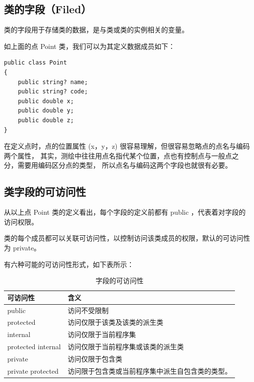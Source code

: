 \subsection{类的字段（Filed）}
类的字段用于存储类的数据，是与类或类的实例相关的变量。

如上面的点 Point 类，我们可以为其定义数据成员如下：

\begin{lstlisting}
public class Point
{
    public string? name;
    public string? code;
    public double x;
    public double y;
    public double z;
}
\end{lstlisting}

在定义点时，点的位置属性 (x，y，z) 很容易理解，但很容易忽略点的点名与编码两个属性，
其实，测绘中往往用点名指代某个位置，点也有控制点与一般点之分，需要用编码区分点的类型，
所以点名与编码这两个字段也就很有必要。

\subsection{类字段的可访问性}

从以上点 Point 类的定义看出，每个字段的定义前都有 public ，代表着对字段的访问权限。

类的每个成员都可以关联可访问性，以控制访问该类成员的权限，默认的可访问性为 private。

有六种可能的可访问性形式，如下表所示：

\begin{table}[htbp]
    \centering
    \caption{字段的可访问性}
    \label{tab:fieldaccessibility}
    \begin{tabular}{l l}
        \hline
        可访问性               & 含义                       \\
        \hline
        public             & 访问不受限制                   \\
        protected          & 访问仅限于该类及该类的派生类           \\
        internal           & 访问仅限于当前程序集               \\
        protected internal & 访问仅限于当前程序集或该类的派生类        \\
        private            & 访问仅限于包含类                 \\
        private protected  & 访问限于包含类或当前程序集中派生自包含类的类型。 \\
        \hline
    \end{tabular}
\end{table}

